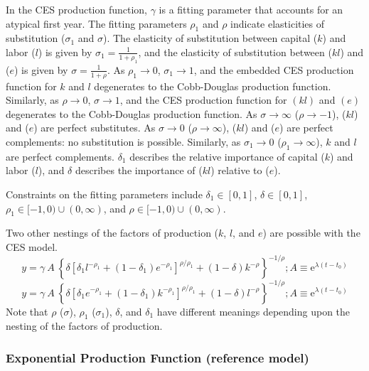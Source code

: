 \documentclass[preprint,authoryear,12pt]{elsarticle}\usepackage[]{graphicx}\usepackage[]{color}
\begin{document}
In the CES production function, 
$\gamma$ is a fitting parameter that accounts for an atypical first year. 
The fitting parameters $\rho_1$ and $\rho$ indicate elasticities 
of substitution ($\sigma_1$ and $\sigma$).
The elasticity of substitution 
between capital ($k$) and labor ($l$) is given by 
$\sigma_1 = \frac{1}{1+\rho_1}$, and
the elasticity of substitution between ($kl$) and ($e$) is given by 
$\sigma = \frac{1}{1+\rho}$. 
As $\rho_1 \rightarrow 0$, $\sigma_1 \rightarrow 1$,
and the embedded CES production function for $k$ and $l$ degenerates 
to the Cobb-Douglas production function.
Similarly, as $\rho \rightarrow 0$, $\sigma \rightarrow 1$,
and the CES production function for $(kl)$ and $(e)$ degenerates 
to the Cobb-Douglas production function.
As $\sigma \rightarrow \infty$ ($\rho \rightarrow -1$), 
($kl$) and ($e$) are perfect substitutes. 
As $\sigma \rightarrow 0$ ($\rho \rightarrow \infty$), 
($kl$) and ($e$) are perfect complements: 
no substitution is possible. Similarly, 
as $\sigma_1 \rightarrow 0$ ($\rho_1 \rightarrow \infty$),
$k$ and $l$ are perfect complements.
$\delta_1$ describes the relative importance of capital ($k$)
and labor ($l$), and
$\delta$ describes the importance of ($kl$) relative to ($e$).

Constraints on the fitting parameters include 
$\delta_1 \in [0,1]$,
$\delta \in [0,1]$,
$\rho_1 \in [-1,0) \cup (0,\infty)$, and
$\rho \in [-1,0) \cup (0,\infty)$. 

Two other nestings of the factors of production ($k$, $l$, and $e$)
are possible with the CES model.
%
\begin{equation} \label{eq:CESlek}
  y = \gamma \: A \: \left\{\delta \left[\delta_1 l^{-\rho_1} 
      + (1-\delta_1) e^{-\rho_1} \right]^{\rho/\rho_1} 
      + (1-\delta) k^{-\rho} \right\}^{-1/\rho}; 
      A \equiv \mathrm{e}^{\lambda (t-t_0)}
\end{equation}
%
\begin{equation} \label{eq:CESekl}
  y = \gamma \: A \: \left\{\delta \left[\delta_1 e^{-\rho_1} 
      + (1-\delta_1) k^{-\rho_1} \right]^{\rho/\rho_1} 
      + (1-\delta) l^{-\rho} \right\}^{-1/\rho}; 
      A \equiv \mathrm{e}^{\lambda (t-t_0)}
\end{equation}
% 
Note that $\rho$ ($\sigma$), $\rho_1$ ($\sigma_1$), $\delta$, and $\delta_1$ have different
meanings depending upon the nesting of the factors of production.


\subsubsection{Exponential Production Function (reference model)} 
\label{sec:exp}
\end{document}
